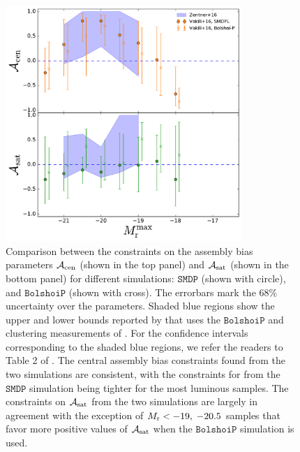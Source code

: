 \documentclass[twocolumn]{aastex61}
\newcommand{\acen}{\mathcal{A}_{\rm cen}}
\newcommand{\asat}{\mathcal{A}_{\rm sat}}
\begin{document}
\begin{figure}[p]~\\
\begin{center}
\includegraphics[width=0.8\textwidth]{bias_comparison.pdf}
\caption{Comparison between the constraints on the assembly bias parameters $\acen$ (shown in the top panel) and $\asat$ (shown in the bottom panel) for different simulations: $\mathtt{SMDP}$ (shown with circle), and $\mathtt{BolshoiP}$ (shown with cross). The errorbars mark the 68$\%$ uncertainty over the parameters. Shaded blue regions show the upper and lower bounds reported by \citet{zentner2016} that uses the $\mathtt{BolshoiP}$ and clustering measurements of \citet{zehavi2011}. For the confidence intervals corresponding to the shaded blue regions, we refer the readers to Table 2 of \citet{zentner2016}. The central assembly bias constraints found from the two simulations are consistent, with the constraints for from the $\mathtt{SMDP}$ simulation being tighter for the most luminous samples. The constraints on $\asat$ from the two simulations are largely in agreement with the exception of $M_{\rm r}<-19 ,\; -20.5$ samples that favor more positive values of $\asat$ when the $\mathtt{BolshoiP}$ simulation is used.}
\label{fig:bias_comparison}
\end{center}
\end{figure}

\end{document}
